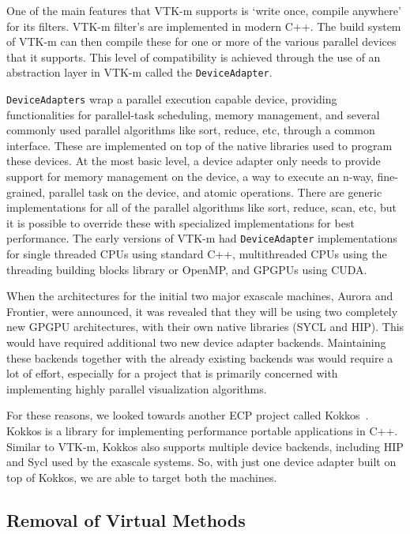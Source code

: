 One of the main features that VTK-m supports is ‘write once, compile anywhere’ for its filters. VTK-m filter’s are implemented in modern C++. The build system of VTK-m can then compile these for one or more of the various parallel devices that it supports. This level of compatibility is achieved through the use of an abstraction layer in VTK-m called the \texttt{DeviceAdapter}. 

\texttt{DeviceAdapters} wrap a parallel execution capable device, providing functionalities for parallel-task scheduling, memory management, and several commonly used parallel algorithms like sort, reduce, etc, through a common interface. These are implemented on top of the native libraries used to program these devices. At the most basic level, a device adapter only needs to provide support for memory management on the device, a way to execute an n-way, fine-grained, parallel task on the device, and atomic operations. There are generic implementations for all of the parallel algorithms like sort, reduce, scan, etc, but it is possible to override these with specialized implementations for best performance. The early versions of VTK-m had \texttt{DeviceAdapter} implementations for single threaded CPUs using standard C++, multithreaded CPUs using the threading building blocks library or OpenMP, and GPGPUs using CUDA.

When the architectures for the initial two major exascale machines, Aurora and Frontier, were announced, it was revealed that they will be using two completely new GPGPU architectures, with their own native libraries (SYCL and HIP). This would have required additional two new device adapter backends. Maintaining these backends together with the already existing backends was would require a lot of effort, especially for a project that is primarily concerned with implementing highly parallel visualization algorithms.

For these reasons, we looked towards another ECP project called Kokkos~\cite{Edwards2014, Trott2022}. Kokkos is a library for implementing performance portable applications in C++. Similar to VTK-m, Kokkos also supports multiple device backends, including HIP and Sycl used by the exascale systems. So, with just one device adapter built on top of Kokkos, we are able to target both the machines.


\subsection{Removal of Virtual Methods}

